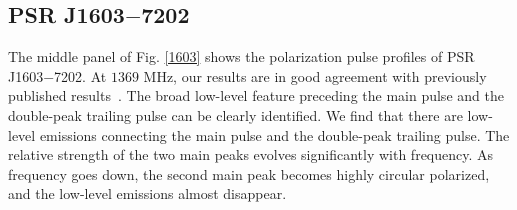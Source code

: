 \documentclass[useAMS,usenatbib]{mn2e}
\begin{document}
\begin{appendices}
%
%
%
%


\subsection{PSR J1603$-$7202}

The middle panel of Fig. \ref{1603} shows the polarization pulse profiles of 
PSR J1603$-$7202.
%
At $1369$ MHz, our results are in good agreement with previously published
results~\citep{Ord04,Yan11}.
%
The broad low-level feature preceding the main pulse and the double-peak trailing 
pulse can be clearly identified.
%
We find that there are low-level emissions connecting the main pulse and the 
double-peak trailing pulse.
%
The relative strength of the two main peaks evolves significantly with frequency.
%
As frequency goes down, the second main peak becomes highly circular polarized, 
and the low-level emissions almost disappear.

%
%
%



\end{appendices}
\end{document}
